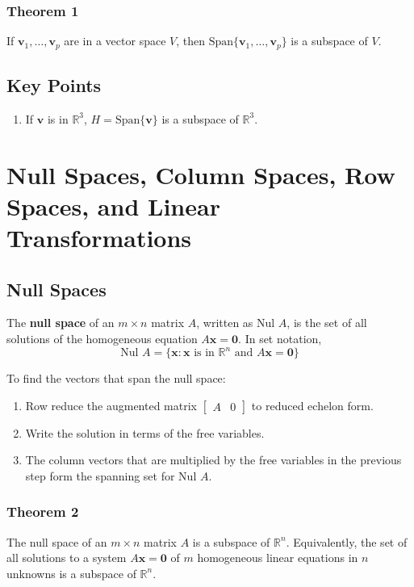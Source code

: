 \documentclass{article}
\begin{document}
\subsubsection*{Theorem 1}
If $\mathbf{v}_1,\ldots, \mathbf{v}_p$ are in a vector space $V$, then
$\text{Span}\{\mathbf{v}_1,\ldots, \mathbf{v}_p\}$ is a subspace of $V$.

\subsection*{Key Points}
\begin{enumerate}
    \item If $\mathbf{v}$ is in $\mathbb{R}^3$, $H=\text{Span}\{\mathbf{v}\}$ is a subspace of
    $\mathbb{R}^3$.
\end{enumerate}

\pagebreak

\section*{Null Spaces, Column Spaces, Row Spaces, and Linear Transformations}
\subsection*{Null Spaces}
The \textbf{null space} of an $m\times n$ matrix $A$, written as $\text{Nul } A$, is the set of all
solutions of the homogeneous equation $A\mathbf{x}=\mathbf{0}$. In set notation,
\[\text{Nul } A = \{\mathbf{x} : \mathbf{x} \text{ is in } \mathbb{R}^n \text{ and }A\mathbf{x}=
\mathbf{0}\}\]

To find the vectors that span the null space:
\begin{enumerate}
    \item Row reduce the augmented matrix $\begin{bmatrix}A & 0\end{bmatrix}$ to reduced echelon
    form.
    \item Write the solution in terms of the free variables.
    \item The column vectors that are multiplied by the free variables in the previous step form
    the spanning set for $\text{Nul } A$.
\end{enumerate}

\subsubsection*{Theorem 2}
The null space of an $m\times n$ matrix $A$ is a subspace of $\mathbb{R}^n$. Equivalently, the set
of all solutions to a system $A\mathbf{x}=\mathbf{0}$ of $m$ homogeneous linear equations in $n$
unknowns is a subspace of $\mathbb{R}^n$.
\end{document}
